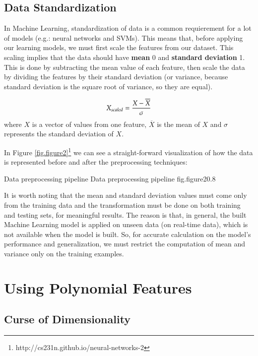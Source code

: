 \subsection{Data Standardization}

In Machine Learning, standardization of data is a common requierement for a 
lot of models (e.g.: neural networks and SVMs). This means that, before 
applying our learning models, we must first scale the features from our dataset. 
This scaling implies that the data should have {\bf mean} 0 and {\bf standard 
deviation} 1. This is done by subtracting the mean value of each feature, then 
scale the data by dividing the features by their standard deviation (or variance, 
because standard deviation is the square root of variance, so they are equal).

\begin{equation}
\centering
X_{scaled} = \frac{X-\overline{X}}{\sigma}
\end{equation}
where $X$ is a vector of values from one feature, $\overline{X}$ is the mean of $X$ and 
$\sigma$ represents the standard deviation of $X$.

In Figure \ref{fig.figure2}\footnote{http://cs231n.github.io/neural-networks-2} we can 
see a straight-forward visualization of how the data is represented before and after 
the preprocessing techniques:

%
    {Data preprocessing pipeline}%
    {Data preprocessing pipeline}%
    {fig.figure2}{0.8}

It is worth noting that the mean and standard deviation values must come only 
from the training data and the transformation must be done on both training and 
testing sets, for meaningful results. The reason is that, in general, the built 
Machine Learning model is applied on unseen data (on real-time data), which is 
not available when the model is built. So, for accurate calculation on the 
model's performance and generalization, we must restrict the computation of 
mean and variance only on the training examples.

\section{Using Polynomial Features}

\subsection{Curse of Dimensionality}


